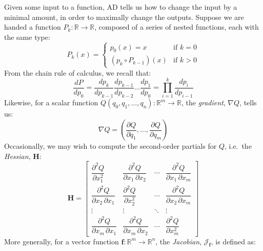 \documentclass[12pt,initial,twoside,maitrise]{dms}
\numberwithin{equation}{section}
\numberwithin{table}{chapter}
\numberwithin{figure}{chapter}
\begin{document}
Given some input to a function, AD tells us how to change the input by a minimal amount, in order to maximally change the outputs. Suppose we are handed a function $P_k: \mathbb{R}\rightarrow\mathbb{R}$, composed of a series of nested functions, each with the same type:
%
\begin{equation}
    P_k(x) = \begin{cases} p_0(x) = x &\text{if } k=0\\ (p_k\circ P_{k-1})(x)&\text{if } k > 0 \end{cases}
\end{equation}
%
From the chain rule of calculus, we recall that:
%
\begin{equation}
    \frac{dP}{dp_0} = \frac{dp_k}{dp_{k-1}}\frac{dp_{k-1}}{dp_{k-2}}\dots\frac{dp_1}{dp_0}= {\displaystyle \prod_{i=1}^{k} \frac{dp_{i}}{dp_{i-1}}}
\end{equation}
%
Likewise, for a scalar function $Q(q_0, q_1, \dots, q_n): \mathbb{R}^m\rightarrow\mathbb{R}$, the \textit{gradient}, $\nabla Q$, tells us:
%
\begin{equation}
    \nabla Q = \left( \frac{\partial Q}{\partial q_1}, \dots, \frac{\partial Q}{\partial q_m}\right)
\end{equation}
%
Occasionally, we may wish to compute the second-order partials for $Q$, i.e.\ the \textit{Hessian}, $\mathbf{H}$:
%
\begin{equation}
\mathbf{H} = \begin{bmatrix}{\dfrac {\partial ^{2}Q}{\partial x_{1}^{2}}}&{\dfrac {\partial ^{2}Q}{\partial x_{1}\,\partial x_{2}}}&\cdots &{\dfrac {\partial ^{2}Q}{\partial x_{1}\,\partial x_{m}}}\\[2.2ex]{\dfrac {\partial ^{2}Q}{\partial x_{2}\,\partial x_{1}}}&{\dfrac {\partial ^{2}Q}{\partial x_{2}^{2}}}&\cdots &{\dfrac {\partial ^{2}Q}{\partial x_{2}\,\partial x_{m}}}\\[2.2ex]\vdots &\vdots &\ddots &\vdots \\[2.2ex]{\dfrac {\partial ^{2}Q}{\partial x_{m}\,\partial x_{1}}}&{\dfrac {\partial ^{2}Q}{\partial x_{m}\,\partial x_{2}}}&\cdots &{\dfrac {\partial ^{2}Q}{\partial x_{m}^{2}}}\end{bmatrix}
\end{equation}
%
More generally, for a vector function $\mathbf{f}: \mathbb{R}^m\rightarrow\mathbb{R}^n$, the \textit{Jacobian}, $\mathcal{J}_{\mathbf{f}}$, is defined as:
%
\end{document}
